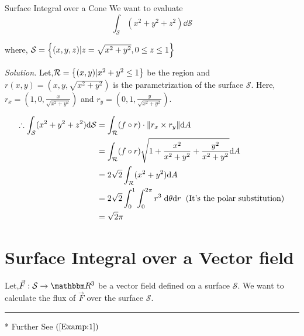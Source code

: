 \documentclass[Analysis-3]{subfiles}
\begin{document}
\begin{Eg}{Surface Integral over a Cone}{}
We want to evaluate \[ \int_{\mathcal{S}}(x^2+y^2+z^2) \dd \mathcal{S}\]    

where, $\mathcal{S} = \qty{(x,y,z) | z = \sqrt{x^2 + y^2},0 \le z \le 1}$

\textit{Solution.} Let,$\mathcal{R} = \qty{(x,y)| x^2+y^2 \le 1}$ be the region and $r(x,y) = (x,y,\sqrt{x^2+y^2})$ is the parametrization of the surface $\mathcal{S}$. Here, $r_x = (1,0, \frac{x}{\sqrt{x^2+y^2}})$ and $r_y = (0,1,\frac{y}{\sqrt{x^2+y^2}})$.


\begin{align*}
    \therefore \int_{\mathcal{S}}(x^2+y^2+z^2) \dd \mathcal{S} &= \int_{\mathcal{R}} (f\circ r) \cdot \norm{r_x \times r_y} \dd A \\
    &= \int_{\mathcal{R}} (f\circ r) \sqrt{1 + \frac{x^2}{x^2+y^2} + \frac{y^2}{x^2+y^2}} \dd A \\
    &= 2\sqrt{2} \int_{\mathcal{R}} (x^2+y^2) \dd A \\
    &= 2\sqrt{2} \int_{0}^{1} \int_{0}^{2\pi} r^3 \hspace{0.1cm} \dd \theta \dd r \hspace{0.2cm} (\text{It's the polar substitution})\\
    &= \sqrt{2} \pi 
\end{align*}

\end{Eg}

\section{Surface Integral over a Vector field}

Let,$\vec{F} : \mathcal{S} \to \R^3$ be a vector field defined on a surface $\mathcal{S}$. We want to calculate the flux of $\vec{F}$ over the surface $\mathcal{S}$.

\vspace{0.2cm}

\hrule

\vspace{0.2cm}
* Further See $(\ref{Examp:1})$ 

\pagebreak
\end{document}

